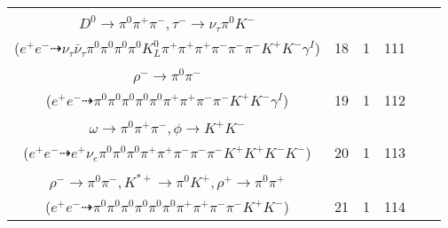 \documentclass[landscape]{article}
\newcounter{rownumbers}
\newcommand\rn{\stepcounter{rownumbers}\arabic{rownumbers}}
\newcommand{\EOLP}{\\ \hline} %
\newcommand{\topoTags}[1]{#1} %
\begin{document}
\begin{longtable}{clcccc}
\rn & \makecell[l]{ $ 
e^{+} e^{-} \rightarrow \pi^{+} \rho^{-} K^{+} \phi D^{*0} D_{s}^{-} \gamma^{I} ,
\rho^{-} \rightarrow \pi^{0} \pi^{-} ,
\phi \rightarrow K_{L}^{0} K_{S}^{0} ,
D^{*0} \rightarrow \pi^{0} D^{0} ,
D_{s}^{-} \rightarrow \tau^{-} \bar{\nu}_{\tau} ,
K_{S}^{0} \rightarrow \pi^{+} \pi^{-} ,
$ \\ $
D^{0} \rightarrow \pi^{0} \pi^{+} \pi^{-} ,
\tau^{-} \rightarrow \nu_{\tau} \pi^{0} K^{-} 
$ \\ ($
e^{+} e^{-} \dashrightarrow \nu_{\tau} \bar{\nu}_{\tau} \pi^{0} \pi^{0} \pi^{0} \pi^{0} K_{L}^{0} \pi^{+} \pi^{+} \pi^{+} \pi^{-} \pi^{-} \pi^{-} K^{+} K^{-} \gamma^{I} 
$) } & \topoTags{18 & }1 & 111 \EOLP

\rn & \makecell[l]{ $ 
e^{+} e^{-} \rightarrow \pi^{+} \pi^{-} D^{*0} \bar{D}^{*0} \gamma^{I} ,
D^{*0} \rightarrow \pi^{0} D^{0} ,
\bar{D}^{*0} \rightarrow \pi^{0} \bar{D}^{0} ,
D^{0} \rightarrow \pi^{0} \pi^{+} K^{-} ,
\bar{D}^{0} \rightarrow K^{+} a_{1}^{-} ,
a_{1}^{-} \rightarrow \pi^{0} \rho^{-} ,
$ \\ $
\rho^{-} \rightarrow \pi^{0} \pi^{-} 
$ \\ ($
e^{+} e^{-} \dashrightarrow \pi^{0} \pi^{0} \pi^{0} \pi^{0} \pi^{0} \pi^{+} \pi^{+} \pi^{-} \pi^{-} K^{+} K^{-} \gamma^{I} 
$) } & \topoTags{19 & }1 & 112 \EOLP

\rn & \makecell[l]{ $ 
e^{+} e^{-} \rightarrow \pi^{0} \bar{K}^{*} D^{*-} D_{s0}^{*+} ,
\bar{K}^{*} \rightarrow \pi^{+} K^{-} ,
D^{*-} \rightarrow \pi^{-} \bar{D}^{0} ,
D_{s0}^{*+} \rightarrow \pi^{0} D_{s}^{+} ,
\bar{D}^{0} \rightarrow \pi^{-} \omega K^{+} ,
D_{s}^{+} \rightarrow e^{+} \nu_{e} \phi ,
$ \\ $
\omega \rightarrow \pi^{0} \pi^{+} \pi^{-} ,
\phi \rightarrow K^{+} K^{-} 
$ \\ ($
e^{+} e^{-} \dashrightarrow e^{+} \nu_{e} \pi^{0} \pi^{0} \pi^{0} \pi^{+} \pi^{+} \pi^{-} \pi^{-} \pi^{-} K^{+} K^{+} K^{-} K^{-} 
$) } & \topoTags{20 & }1 & 113 \EOLP

\rn & \makecell[l]{ $ 
e^{+} e^{-} \rightarrow \pi^{0} \pi^{-} D^{*+} \bar{D}^{*0} ,
D^{*+} \rightarrow \pi^{+} D^{0} ,
\bar{D}^{*0} \rightarrow \pi^{0} \bar{D}^{0} ,
D^{0} \rightarrow K^{-} a_{1}^{+} ,
\bar{D}^{0} \rightarrow \rho^{-} K^{*+} ,
a_{1}^{+} \rightarrow \pi^{0} \rho^{+} ,
$ \\ $
\rho^{-} \rightarrow \pi^{0} \pi^{-} ,
K^{*+} \rightarrow \pi^{0} K^{+} ,
\rho^{+} \rightarrow \pi^{0} \pi^{+} 
$ \\ ($
e^{+} e^{-} \dashrightarrow \pi^{0} \pi^{0} \pi^{0} \pi^{0} \pi^{0} \pi^{0} \pi^{+} \pi^{+} \pi^{-} \pi^{-} K^{+} K^{-} 
$) } & \topoTags{21 & }1 & 114 \EOLP


\end{longtable}
\end{document}
